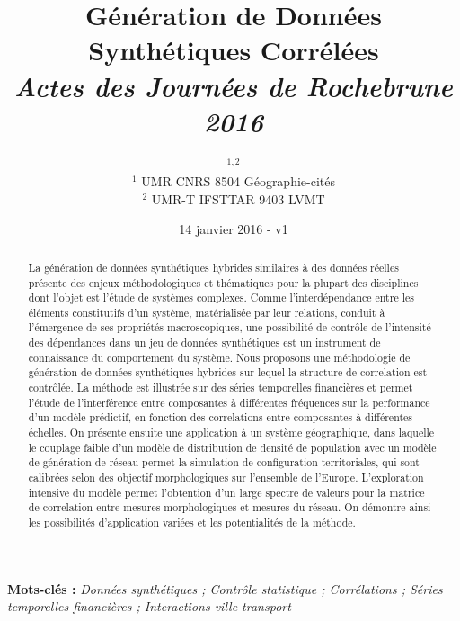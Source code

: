 


\title{\vspace{-2.5cm}Génération de Données Synthétiques Corrélées\\\medskip
\textit{Actes des Journées de Rochebrune 2016}
}
\author{$^{1,2}$\\
$^{1}$ UMR CNRS 8504 Géographie-cités\\
$^{2}$ UMR-T IFSTTAR 9403 LVMT
}
\date{14 janvier 2016 - v1}


\maketitle

\justify

\vspace{-0.5cm}
\begin{abstract}
La génération de données synthétiques hybrides similaires à des données réelles présente des enjeux méthodologiques et thématiques pour la plupart des disciplines dont l'objet est l'étude de systèmes complexes. Comme l'interdépendance entre les éléments constitutifs d'un système, matérialisée par leur relations, conduit à l'émergence de ses propriétés macroscopiques, une possibilité de contrôle de l'intensité des dépendances dans un jeu de données synthétiques est un instrument de connaissance du comportement du système. Nous proposons une méthodologie de génération de données synthétiques hybrides sur lequel la structure de correlation est contrôlée. La méthode est illustrée sur des séries temporelles financières et permet l'étude de l'interférence entre composantes à différentes fréquences sur la performance d'un modèle prédictif, en fonction des correlations entre composantes à différentes échelles. On présente ensuite une application à un système géographique, dans laquelle le couplage faible d'un modèle de distribution de densité de population avec un modèle de génération de réseau permet la simulation de configuration territoriales, qui sont calibrées selon des objectif morphologiques sur l'ensemble de l'Europe. L'exploration intensive du modèle permet l'obtention d'un large spectre de valeurs pour la matrice de correlation entre mesures morphologiques et mesures du réseau. On démontre ainsi les possibilités d'application variées et les potentialités de la méthode.
\end{abstract}

\medskip

\textbf{Mots-clés : } \textit{Données synthétiques ; Contrôle statistique ; Corrélations ; Séries temporelles financières ; Interactions ville-transport}


